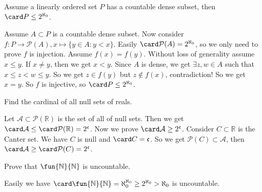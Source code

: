 \documentclass[a5paper]{ctexart}
\begin{document}
\begin{problem}\label{pro:5}
  Assume a linearly ordered set \(P\) has a countable dense subset, then \(\card P \leq 2^{\aleph_0}\). 
\end{problem}
\begin{solution}
  Assume \(A \subset P\) is a countable dense subset. Now consider \(f:P \to \mathcal{P}( A),x \mapsto \{ y \in A:y < x\}\). 
  Easily \(\card \mathcal{P}( A)=2^{\aleph_0}\), so we only need to prove \(f\) is injection. 
  Assume \(f( x)=f( y)\). Without loss of generality assume \(x \leq y\). If \(x \neq y\), then we get \(x < y\). 
  Since \(A\) is dense, we get \(\exists z,w \in A\) such that \(x \leq z < w \leq y\).
  So we get \(z \in f( y)\) but \(z \notin f( x)\), contradiction! 
  So we get \(x = y\). So \(f\) is injective, so \(\card P \leq 2^{\aleph_0}\). 
\end{solution}
\begin{problem}\label{pro:6}
  Find the cardinal of all null sets of reals.
\end{problem}
\begin{solution}
  Let \(\mathcal{A} \subset \mathcal{P}( \mathbb{R})\) is the set of all of null sets. 
  Then we get \(\card \mathcal{A} \leq \card \mathcal{P}( \mathbb{R})=2^{\mathfrak{c}}\). 
  Now we prove \(\card \mathcal{A} \geq 2^\mathfrak{c}\). 
  Consider \(C \subset \mathbb{R}\) is the Canter set. We have \(C\) is null and \(\card C=\mathfrak{c}\). 
  So we get \(\mathcal{P}( C)\subset \mathcal{A}\), then \(\card \mathcal{A} \geq \card \mathcal{P}( C)=2^\mathfrak{c}\). 
\end{solution}
\begin{problem}\label{pro:7}
  Prove that \(\fun{\mathbb{N}}{\mathbb{N}}\) is uncountable. 
\end{problem}
\begin{solution}
  Easily we have \(\card \fun{\mathbb{N}}{\mathbb{N}}=\aleph_0^{\aleph_0} \geq 2^{\aleph_0}>\aleph_0\) is uncountable.
\end{solution}
\end{document}
